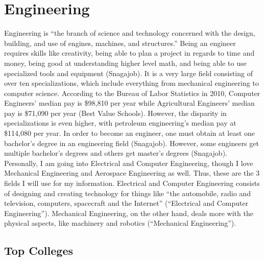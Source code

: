 \chapter{Engineering}
\begin{multicols}{2}

Engineering is “the branch of science and technology concerned with the design, building, and use of engines, machines, and structures.” Being an engineer requires skills like creativity, being able to plan a project in regards to time and money, being good at understanding higher level math, and being able to use specialized tools and equipment (Snagajob). It is a very large field consisting of over ten specializations, which include everything from mechanical engineering to computer science. According to the Bureau of Labor Statistics in 2010, Computer Engineers’ median pay is \$98,810 per year while Agricultural Engineers’ median pay is \$71,090 per year (Best Value Schools). However, the disparity in specializations is even higher, with petroleum engineering’s median pay at \$114,080 per year. In order to become an engineer, one must obtain at least one bachelor’s degree in an engineering field (Snagajob). However, some engineers get multiple bachelor’s degrees and others get master’s degrees (Snagajob). Personally, I am going into Electrical and Computer Engineering, though I love Mechanical Engineering and Aerospace Engineering as well. Thus, these are the 3 fields I will use for my information. Electrical and Computer Engineering consists of designing and creating technology for things like “the automobile, radio and television, computers, spacecraft and the Internet” (“Electrical and Computer Engineering”). Mechanical Engineering, on the other hand, deals more with the physical aspects, like machinery and robotics (“Mechanical Engineering”). 

\end{multicols}

\section{Top Colleges}

